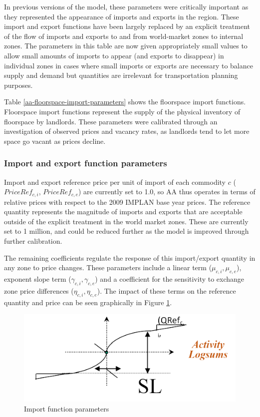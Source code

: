 In previous versions of the model, these parameters were critically important as they represented the appearance of imports and exports in the region. These import and export functions have been largely replaced by an explicit treatment of the flow of imports and exports to and from world-market zones to internal zones. The parameters in this table are now given appropriately small values to allow small amounts of imports to appear (and exports to disappear) in individual zones in cases where small imports or exports are necessary to balance supply and demand but quantities are irrelevant for transportation planning purposes.


Table \ref{aa-floorspace-import-parameters} shows the floorspace import functions. Floorspace import functions represent the supply of the physical inventory of floorspace by landlords. These parameters were calibrated through an investigation of observed prices and vacancy rates, as landlords tend to let more space go vacant as prices decline.

\subsubsection{Import and export function parameters}
Import and export reference price per unit of import of each commodity $c$ ($PriceRef_{c,i}$, $PriceRef_{c,e}$) are currently set to 1.0, so AA thus operates in terms of relative prices with respect to the 2009 IMPLAN base year prices. The reference quantity represents the magnitude of imports and exports that are acceptable outside of the explicit treatment in the world market zones. These are currently set to 1 million, and could be reduced further as the model is improved through further calibration. 

The remaining coefficients regulate the response of this import/export quantity in any zone to price changes. These parameters include a linear term ($\mu_{c,i}, \mu_{c,e}$), exponent slope term ($\gamma_{c,i}, \gamma_{c,e}$) and a coefficient for the sensitivity to exchange zone price differences ($\eta_{c,i}, \eta_{c,e}$). The impact of these terms on the reference quantity and price can be seen graphically in Figure \ref{fig:aa-import-parameters}.

\begin{figure}      %
\centering
\includegraphics[scale=0.8]{aa/errant_figure_6_5}
\caption{Import function parameters}\label{fig:aa-import-parameters}
\end{figure}

